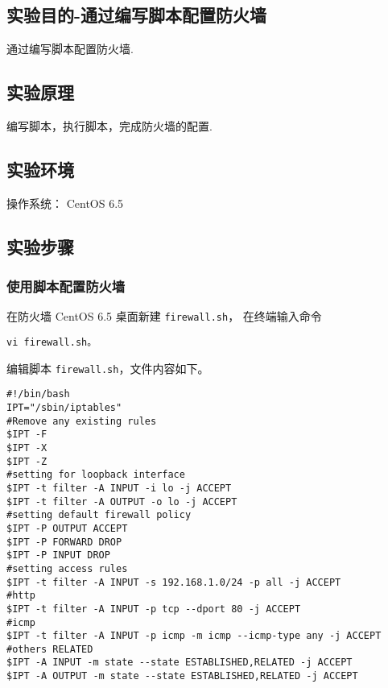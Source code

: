 \subsection{实验目的-通过编写脚本配置防火墙}
通过编写脚本配置防火墙.
%
\subsection{实验原理}
编写脚本，执行脚本，完成防火墙的配置.
%
\subsection{实验环境}
操作系统： CentOS 6.5
%
\subsection{实验步骤}
\subsubsection{使用脚本配置防火墙}
在防火墙 CentOS 6.5 桌面新建 \texttt{firewall.sh}，
在终端输入命令
\begin{verbatim}
vi firewall.sh。
\end{verbatim}

编辑脚本 \texttt{firewall.sh}，文件内容如下。
\begin{verbatim}
#!/bin/bash
IPT="/sbin/iptables"
#Remove any existing rules
$IPT -F
$IPT -X
$IPT -Z
#setting for loopback interface
$IPT -t filter -A INPUT -i lo -j ACCEPT
$IPT -t filter -A OUTPUT -o lo -j ACCEPT
#setting default firewall policy
$IPT -P OUTPUT ACCEPT
$IPT -P FORWARD DROP
$IPT -P INPUT DROP
#setting access rules
$IPT -t filter -A INPUT -s 192.168.1.0/24 -p all -j ACCEPT
#http
$IPT -t filter -A INPUT -p tcp --dport 80 -j ACCEPT
#icmp
$IPT -t filter -A INPUT -p icmp -m icmp --icmp-type any -j ACCEPT
#others RELATED
$IPT -A INPUT -m state --state ESTABLISHED,RELATED -j ACCEPT
$IPT -A OUTPUT -m state --state ESTABLISHED,RELATED -j ACCEPT
\end{verbatim}

